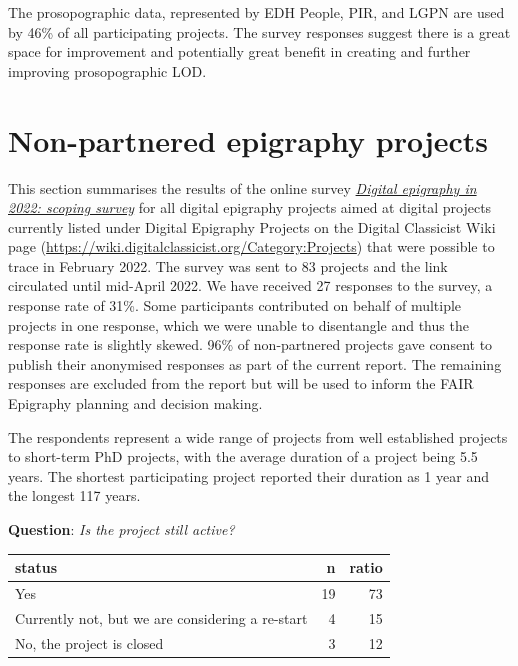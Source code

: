 \documentclass[
  12pt,
]{scrreprt}
\begin{document}
The prosopographic data, represented by EDH People, PIR, and LGPN are
used by 46\% of all participating projects. The survey responses suggest
there is a great space for improvement and potentially great benefit in
creating and further improving prosopographic LOD.

\hypertarget{non-partnered-epigraphy-projects}{%
\chapter{Non-partnered epigraphy
projects}\label{non-partnered-epigraphy-projects}}

This section summarises the results of the online survey
\href{https://github.com/FAIR-epigraphy/scoping_survey_report/data/02_Survey_projects_questions.pdf}{\emph{Digital
epigraphy in 2022: scoping survey}} for all digital epigraphy projects
aimed at digital projects currently listed under Digital Epigraphy
Projects on the Digital Classicist Wiki page
(\url{https://wiki.digitalclassicist.org/Category:Projects}) that were
possible to trace in February 2022. The survey was sent to 83 projects
and the link circulated until mid-April 2022. We have received 27
responses to the survey, a response rate of 31\%. Some participants
contributed on behalf of multiple projects in one response, which we
were unable to disentangle and thus the response rate is slightly
skewed. 96\% of non-partnered projects gave consent to publish their
anonymised responses as part of the current report. The remaining
responses are excluded from the report but will be used to inform the
FAIR Epigraphy planning and decision making.

The respondents represent a wide range of projects from well established
projects to short-term PhD projects, with the average duration of a
project being 5.5 years. The shortest participating project reported
their duration as 1 year and the longest 117 years.

\textbf{Question}: \emph{Is the project still active?}

\begin{longtable}[]{@{}lrr@{}}
\toprule
status & n & ratio \\
\midrule
\endhead
Yes & 19 & 73 \\
Currently not, but we are considering a re-start & 4 & 15 \\
No, the project is closed & 3 & 12 \\
\bottomrule
\end{longtable}
\end{document}
